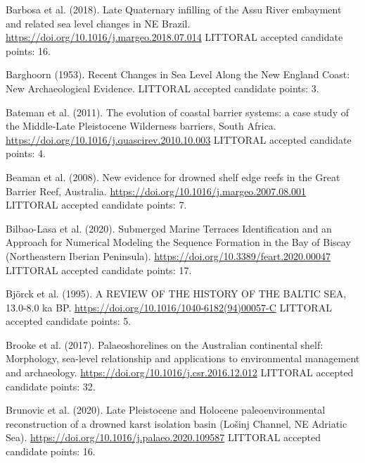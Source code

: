 \documentclass[twocolumn,10pt]{article}
\begin{document}
\begin{thebibliography}{}
Barbosa et al. (2018).
\newblock Late Quaternary infilling of the Assu River embayment and related sea level changes in NE Brazil.
\newblock \url{https://doi.org/10.1016/j.margeo.2018.07.014}
\newblock LITTORAL accepted candidate points: 16.

Barghoorn (1953).
\newblock Recent Changes in Sea Level Along the New England Coast: New Archaeological Evidence.
\newblock LITTORAL accepted candidate points: 3.

Bateman et al. (2011).
\newblock The evolution of coastal barrier systems: a case study of the Middle-Late Pleistocene Wilderness barriers, South Africa.
\newblock \url{https://doi.org/10.1016/j.quascirev.2010.10.003}
\newblock LITTORAL accepted candidate points: 4.

Beaman et al. (2008).
\newblock New evidence for drowned shelf edge reefs in the Great Barrier Reef, Australia.
\newblock \url{https://doi.org/10.1016/j.margeo.2007.08.001}
\newblock LITTORAL accepted candidate points: 7.

Bilbao-Lasa et al. (2020).
\newblock Submerged Marine Terraces Identification and an Approach for Numerical Modeling the Sequence Formation in the Bay of Biscay (Northeastern Iberian Peninsula).
\newblock \url{https://doi.org/10.3389/feart.2020.00047}
\newblock LITTORAL accepted candidate points: 17.

Björck et al. (1995).
\newblock A REVIEW OF THE HISTORY OF THE BALTIC SEA, 13.0-8.0 ka BP.
\newblock \url{https://doi.org/10.1016/1040-6182(94)00057-C}
\newblock LITTORAL accepted candidate points: 5.

Brooke et al. (2017).
\newblock Palaeoshorelines on the Australian continental shelf: Morphology, sea-level relationship and applications to environmental management and archaeology.
\newblock \url{https://doi.org/10.1016/j.csr.2016.12.012}
\newblock LITTORAL accepted candidate points: 32.

Brunovic et al. (2020).
\newblock Late Pleistocene and Holocene paleoenvironmental reconstruction of a drowned karst isolation basin (Lošinj Channel, NE Adriatic Sea).
\newblock \url{https://doi.org/10.1016/j.palaeo.2020.109587}
\newblock LITTORAL accepted candidate points: 16.


\end{thebibliography}
\end{document}
